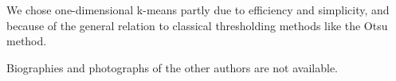 \documentclass[12pt]{spieman}  %
\begin{document}
\begin{spacing}{2}
We chose one-dimensional k-means partly due to efficiency and simplicity, and
because of the general relation to classical thresholding methods like the Otsu
method\cite{liuOtsuMethodKmeans2009}.







\vspace{1ex}
\noindent Biographies and photographs of the other authors are not available.

\listoffigures
\listoftables

\end{spacing}
\end{document}
